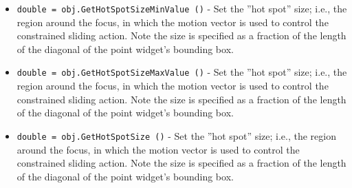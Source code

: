 \begin{itemize}
\item  \verb|double = obj.GetHotSpotSizeMinValue ()| -  Set the ''hot spot'' size; i.e., the region around the focus, in which the
 motion vector is used to control the constrained sliding action. Note the
 size is specified as a fraction of the length of the diagonal of the 
 point widget's bounding box.

\item  \verb|double = obj.GetHotSpotSizeMaxValue ()| -  Set the ''hot spot'' size; i.e., the region around the focus, in which the
 motion vector is used to control the constrained sliding action. Note the
 size is specified as a fraction of the length of the diagonal of the 
 point widget's bounding box.

\item  \verb|double = obj.GetHotSpotSize ()| -  Set the ''hot spot'' size; i.e., the region around the focus, in which the
 motion vector is used to control the constrained sliding action. Note the
 size is specified as a fraction of the length of the diagonal of the 
 point widget's bounding box.

\end{itemize}

